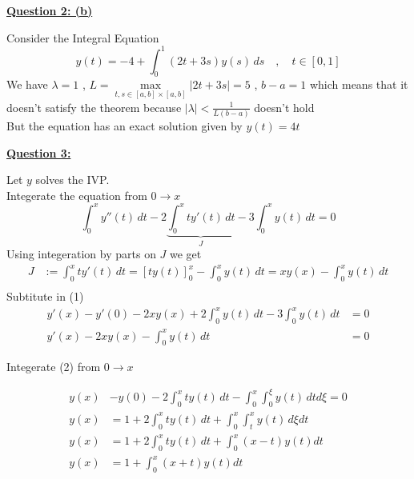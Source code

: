 \documentclass[]{article}
\begin{document}
\textbf{\underline{Question 2: (b)}}
\begin{adjustwidth}{1cm}{2cm}
    Consider the Integral Equation
    \[
        y(t) = -4 + \int_{0}^{1}(2t+3s)y(s) \,ds \quad,\quad  t \in [0,1]
    \]
    We have $\lambda = 1$ , $L = \max\limits_{t,s\in [a,b]\times[a,b]} |2t+3s| = 5$ , $b-a = 1$
    which means that it doesn't satisfy the theorem because $\displaystyle |\lambda|< \frac{1}{L(b-a)}$ doesn't hold
    \\
    But  the equation has an exact solution given by $y(t) = 4t$
\end{adjustwidth}
\textbf{\underline{Question 3:}}
\begin{adjustwidth}{1cm}{2cm}
    Let $y$ solves the IVP.\\
    Integerate the equation from $0 \to x$
    \begin{equation}
        \int_{0}^{x} y''(t) \, dt -2\underbrace{\int_{0}^{x} t y'(t) \,dt}_J -3\int_{0}^{x}y(t) \,dt=0
    \end{equation}
    Using integeration by parts on $J$ we get
    \begin{align*}
        J & := \int_{0}^{x} t y'(t) \,dt = \left[t y(t)\right]_{0}^{x} - \int_{0}^{x}y(t) \,dt= xy(x) - \int_{0}^{x}y(t) \,dt \\
    \end{align*}
    Subtitute in (1)
    \begin{align*}
        y'(x) - y'(0) -2xy(x) + 2\int_{0}^{x}y(t) \,dt -3\int_{0}^{x}y(t) \,dt & =0
        \\
        y'(x) -2xy(x) -\int_{0}^{x}y(t) \,dt                                   & =0 \tag{2}
    \end{align*}

    Integerate (2) from $0 \to x$
    \\
    \begin{minipage}{0.7\textwidth}
        \begin{align*}
            y(x) & -y(0) -2\int_{0}^{x}ty(t)\,dt -\int_{0}^{x}\int_{0}^{\xi}y(t) \, dtd\xi=0
            \\
            y(x) & = 1 +2\int_{0}^{x}ty(t)\,dt +\int_{0}^{x}\int_{t}^{x}y(t) \, d\xi dt
            \\
            y(x) & = 1 +2\int_{0}^{x}ty(t)\,dt +\int_{0}^{x}(x-t)y(t)dt
            \\
            y(x) & = 1 +\int_{0}^{x}(x+t)y(t)dt
        \end{align*}
    \end{minipage}%
    \begin{minipage}{0.3\textwidth}
\end{minipage}
\end{adjustwidth}
\end{document}
